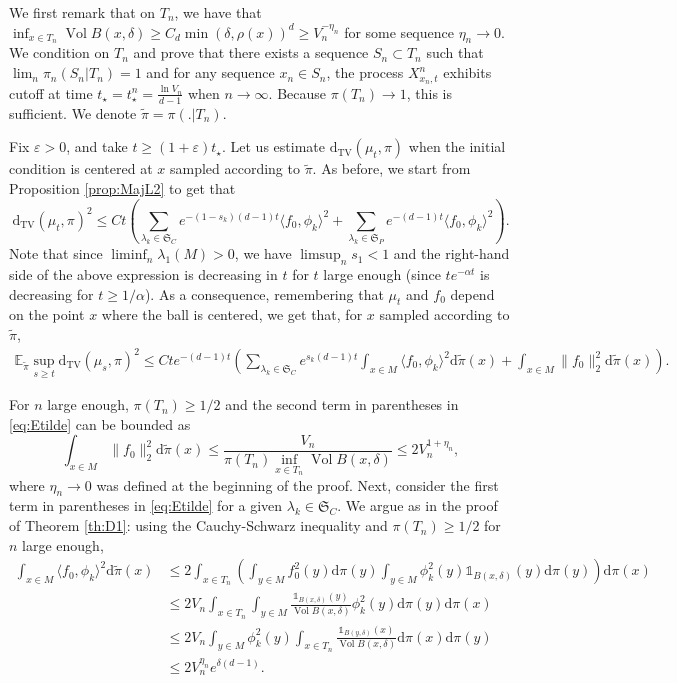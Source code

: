 \documentclass[]{scrartcl}
\newcommand{\DTV}{\mathrm{d_{TV}}}
\newcommand{\E}{\mathbb{E}}
\renewcommand{\d}{\mathrm{d}}
\DeclareMathOperator{\Vol}{Vol}
\numberwithin{equation}{section}
\numberwithin{figure}{section}
\begin{document}
We first remark that on $T_n$, we have that $\inf_{x \in T_n} \Vol B (x , \delta) \geq C_d \min(\delta, \rho(x))^d \geq  V_n^{-\eta_n}$ for some sequence $\eta_n \to 0$. We condition on $T_n$ and prove that there exists a sequence $S_n \subset T_n$ such that $\lim_n \pi_n(S_n\vert T_n) =1$ and for any sequence $x_n \in S_n$, the process $X^n_{x_n,t}$ exhibits cutoff at time $t_\star = t^n_\star = \frac{\ln V_n}{d-1}$ when $n \to \infty$. Because $\pi(T_n) \to 1$, this is sufficient. 			We denote $\widetilde{\pi} = \pi(. |T_n)$.  

Fix $\varepsilon >0$, and take $t \geq (1+\varepsilon)t_\star$. 			Let us estimate $\DTV\left( \mu_t, \pi\right)$ when the initial condition is centered at $x$ sampled according to $\widetilde \pi$. As before, we start from Proposition \ref{prop:MajL2} to get that \[\DTV\left( \mu_t,\pi \right)^2 \leq C t \left( \sum_{\lambda_k \in \mathfrak S_C} e^{-(1-s_k)(d-1)t}\langle f_0, \phi_k \rangle^2 + \sum_{\lambda_k \in \mathfrak S_P} e^{-(d-1)t}\langle f_0, \phi_k \rangle^2 \right).\]
Note that since $\liminf_n \lambda_1(M) > 0$, we have $\limsup_n s_1 < 1$ and the right-hand side of the above expression is decreasing in $t$ for $t$ large enough (since $t e^{-\alpha t}$ is decreasing for $t \geq 1/\alpha$).  			As a consequence, remembering that $\mu_t$ and $f_0$ depend on the point $x$ where the ball is centered, we get that, for $x$ sampled according to $\widetilde \pi$, 
\begin{eqnarray}\label{eq:Etilde}
\E_{\widetilde\pi} \sup_{s \geq t} \DTV\left( \mu_s, \pi\right)^2  \leq Ct e^{-(d-1)t} \left(\sum_{\lambda_k \in \mathfrak S_C} e^{  s_k (d-1)t}\int_{x \in M} \langle f_0, \phi_k \rangle^2  \d\widetilde\pi(x) +  \int_{x \in M} \lVert f_0 \rVert_2^2 \d\widetilde\pi(x)\right).
\end{eqnarray}

For $n$ large enough, $\pi(T_n) \geq 1/2$ and the second term in parentheses in \eqref{eq:Etilde} can be bounded as 
\begin{equation}\label{eq:Etilde1}
	\int_{x \in M} \lVert f_0 \rVert_2^2 \d\widetilde\pi(x) \leq \frac{V_n}{ \pi(T_n) \inf_{x \in T_n} \Vol B(x, \delta)} \leq  2V_n^{1+\eta_n},
\end{equation}
where $\eta_n  \to 0$ was defined at the beginning of the proof. Next,  consider the first term in parentheses in \eqref{eq:Etilde} for a given $\lambda_k \in \mathfrak S_C$. We argue as in the proof of Theorem \ref{th:D1}: using the Cauchy-Schwarz inequality and $\pi(T_n) \geq 1/2$ for $n$ large enough,
\begin{align*}
	\int_{x \in M} \langle f_0, \phi_k \rangle^2  \d\widetilde\pi(x) &\leq 2 \int_{x \in T_n}\left( \int_{y \in M} f_0^2(y) \d\pi(y) \int_{y\in M}\phi^2_k(y)\mathds{1}_{B(x, \delta)}(y) \d\pi(y) \right)\d \pi(x) \\&\leq 2 V_n \int_{x \in T_n} \int_{y \in M} \frac{\mathds 1_{B(x, \delta)}(y)}{\Vol B(x, \delta)} \phi_k^2(y) \d\pi(y)\d \pi(x)\\&\leq  2 V_n \int_{y \in M} \phi_k^2(y) \int_{x \in T_n} \frac{\mathds 1_{B(y, \delta)}(x)}{\Vol B(x, \delta)} \d \pi(x)\d\pi(y)\\&\leq  2 V_n^{\eta_n} e^{\delta(d-1) }.
\end{align*}
\end{document}
